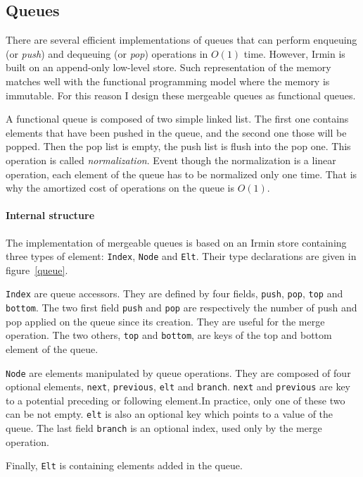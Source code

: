 \documentclass{article}
\renewcommand{\-}{\hyp}
\newcommand{\irmin}{Irmin\xspace}
\newcommand{\code}[1]{\texttt{#1}}
\begin{document}
\subsection{Queues}

There are several efficient implementations of queues that can perform enqueuing (or \emph{push}) and dequeuing (or \emph{pop}) operations in $O(1)$ time.
However, \irmin is built on an append-only low-level store.
Such representation of the memory matches well with the functional programming model where the memory is immutable.
For this reason I design these mergeable queues as functional queues.

A functional queue is composed of two simple linked list.
The first one contains elements that have been pushed in the queue, and the second one those will be popped.
Then the pop list is empty, the push list is flush into the pop one.
This operation is called \emph{normalization}.
Event though the normalization is a linear operation,  each element of the queue has to be normalized only one time.
That is why the amortized cost of operations on the queue is $O(1)$.

\paragraph{Internal structure}
The implementation of mergeable queues is based on an \irmin store containing three types of element: \code{Index}, \code{Node} and \code{Elt}. Their type declarations are given in figure~\ref{queue}.

\code{Index} are queue accessors.
They are defined by four fields, \code{push}, \code{pop}, \code{top} and \code{bottom}.
The two first field \code{push} and \code{pop} are respectively the number of push and pop applied on the queue since its creation.
They are useful for the merge operation.
The two others, \code{top} and \code{bottom}, are keys of the top and bottom element of the queue.

\code{Node} are elements manipulated by queue operations.
They are composed of four optional elements, \code{next}, \code{previous}, \code{elt} and \code{branch}. \code{next} and \code{previous} are key to a potential preceding or following element.In practice, only one of these two can be not empty. \code{elt} is also an optional key which points to a value of the queue. The last field \code{branch} is an optional index, used only by the merge operation.

Finally, \code{Elt} is containing elements added in the queue.
\end{document}
